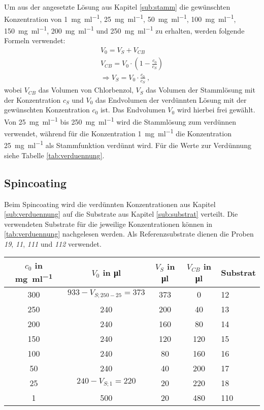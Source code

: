 Um aus der angesetzte Lösung aus Kapitel \ref{sub:stamm} die gewünschten Konzentration von \SI{1}{\milli\gram\per\milli\litre}, \SI{25}{\milli\gram\per\milli\litre}, \SI{50}{\milli\gram\per\milli\litre}, \SI{100}{\milli\gram\per\milli\litre}, \SI{150}{\milli\gram\per\milli\litre}, \SI{200}{\milli\gram\per\milli\litre} und \SI{250}{\milli\gram\per\milli\litre} zu erhalten, werden folgende Formeln verwendet:
\begin{gather}
	V_0 = V_S + V_{CB}\\
	\boxed{V_{CB} = V_0 \cdot \left( 1 - \frac{c_0}{c_S} \right)}\\
	\Rightarrow \boxed{V_S = V_0 \cdot \frac{c_0}{c_S}}~,
	\label{eq:vol}
\end{gather}
wobei $V_{CB}$ das Volumen von Chlorbenzol, $V_S$ das Volumen der Stammlösung mit der Konzentration $c_S$ und $V_0$ das Endvolumen der verdünnten Lösung mit der gewünschten Konzentration $c_0$ ist. Das Endvolumen $V_0$ wird hierbei frei gewählt. Von \SI{25}{\milli\gram\per\milli\litre} bis \SI{250}{\milli\gram\per\milli\litre} wird die Stammlösung zum verdünnen verwendet, während für die Konzentration \SI{1}{\milli\gram\per\milli\litre} die Konzentration \SI{25}{\milli\gram\per\milli\litre} als Stammfunktion verdünnt wird. Für die Werte zur Verdünnung siehe Tabelle \ref{tab:verduennung}.

\subsection{Spincoating}
\label{sub:spin}

Beim Spincoating wird die verdünnten Konzentrationen aus Kapitel \ref{sub:verduennung} auf die Substrate aus Kapitel \ref{sub:substrat} verteilt. Die verwendeten Substrate für die jeweilige Konzentrationen können in \ref{tab:verduennung} nachgelesen werden. Als Referenzsubstrate dienen die Proben \textit{19}, \textit{11}, \textit{111} und \textit{112} verwendet.

\begin{center}
	\captionsetup{type=table}	
	\begin{tabular}{c | c | c c | l}
		$c_0$ in \si{\milli\gram\per\milli\litre} & $V_0$ in \si{\micro\litre}  & $V_S$ in \si{\micro\litre} & $V_{CB}$ in \si{\micro\litre} & Substrat \\[0,1cm]
		\hline
		300  &  $933 - V_{S;250-25} = 373$  &  373  &    0  &   12 \\
		250  &  					  240   &  200  &   40  &   13 \\
		200  &  					  240   &  160  &   80  &   14 \\
		150  &  					  240   &  120  &  120  &   15 \\
		100  &  					  240   &   80  &  160  &   16 \\
		 50  &  					  240   &   40  &  200  &   17 \\
		 25  &  $240 - V_{S;1}		= 220$  &   20  &  220  &   18 \\
		  1  &  					  500   &   20  &  480  &  110 \\
	\end{tabular}
	\label{tab:verduennung}
\end{center}

